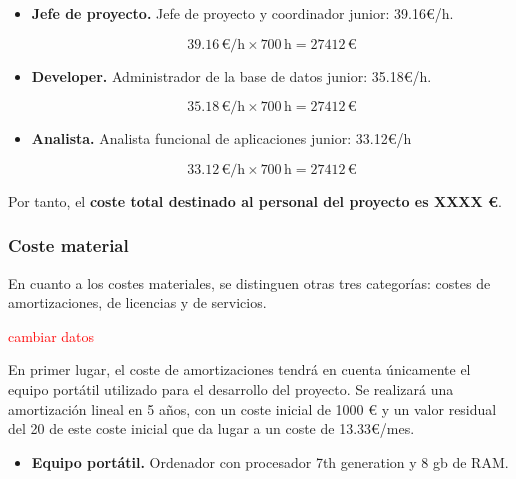 \begin{itemize}
    \item \textbf{Jefe de proyecto.} Jefe de proyecto y coordinador junior: 39.16€/h.

\begin{equation}
   39.16 \, \text{€/h} \times 700 \, \text{h} = 27412 \, \text{€}
\end{equation}

    \item \textbf{Developer.} Administrador de la base de datos junior: 35.18€/h.

\begin{equation}
    35.18 \, \text{€/h} \times 700 \, \text{h} = 27412 \, \text{€}
\end{equation}

    \item \textbf{Analista.} Analista funcional de aplicaciones junior: 33.12€/h

\begin{equation}
    33.12 \, \text{€/h} \times 700 \, \text{h} = 27412 \, \text{€}
\end{equation}

\end{itemize}

Por tanto, el\textbf{ coste total destinado al personal del proyecto es XXXX €}.

%


\subsubsection{Coste material}

En cuanto a los costes materiales, se distinguen otras tres categorías: costes de amortizaciones, de licencias y de servicios. 

\textcolor{red}{cambiar datos}

En primer lugar, el coste de amortizaciones tendrá en cuenta únicamente el equipo portátil utilizado para el desarrollo del proyecto. Se realizará una amortización lineal en 5 años, con un coste inicial de 1000 € y un valor residual del 20 de este coste inicial que da lugar a un coste de 13.33€/mes.

\begin{itemize}
    \item \textbf{Equipo portátil.} Ordenador con procesador 7th generation y 8 gb de RAM.
\end{itemize}


